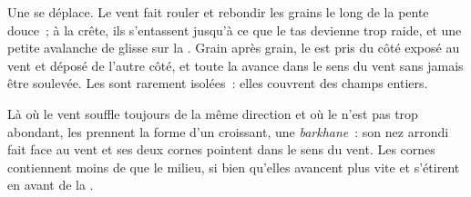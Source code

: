 Une  se déplace. Le vent fait rouler et rebondir les grains le long de
la pente douce~; à la crête, ils s'entassent jusqu'à ce que le tas devienne
trop raide, et une petite avalanche de  glisse sur la . Grain après grain, le  est pris du côté exposé au vent
et déposé de l'autre côté, et toute la  avance dans le sens du vent
sans jamais être soulevée. Les  sont rarement isolées~: elles
couvrent des champs entiers.

Là où le vent souffle toujours de la même direction et où le  n'est
pas trop abondant, les  prennent la forme d'un croissant, une
\emph{barkhane}~: son nez arrondi fait face au vent et ses deux cornes
pointent dans le sens du vent. Les cornes contiennent moins de  que
le milieu, si bien qu'elles avancent plus vite et s'étirent en avant de la
.

